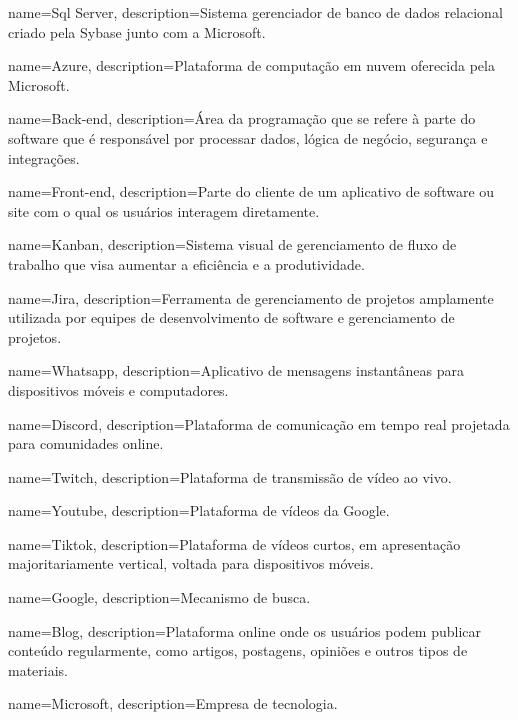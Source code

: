  {
    name=Sql Server,
    description={Sistema gerenciador de banco de dados relacional criado pela Sybase junto com a Microsoft.}
}

 {
    name=Azure,
    description={Plataforma de computação em nuvem oferecida pela Microsoft.}
}

 {
    name=Back-end,
    description={Área da programação que se refere à parte do software que é responsável por processar dados, lógica de negócio, segurança e integrações.}
}

 {
    name=Front-end,
    description={Parte do cliente de um aplicativo de software ou site com o qual os usuários interagem diretamente.}
}

 {
    name=Kanban,
    description={Sistema visual de gerenciamento de fluxo de trabalho que visa aumentar a eficiência e a produtividade.}
}

 {
    name=Jira,
    description={Ferramenta de gerenciamento de projetos amplamente utilizada por equipes de desenvolvimento de software e gerenciamento de projetos.}
}

 {
    name=Whatsapp,
    description={Aplicativo de mensagens instantâneas para dispositivos móveis e computadores.}
}

 {
    name=Discord,
    description={Plataforma de comunicação em tempo real projetada para comunidades online.}
}

 {
    name=Twitch,
    description={Plataforma de transmissão de vídeo ao vivo.}
}

 {
    name=Youtube,
    description={Plataforma de vídeos da Google.}
}

 {
    name=Tiktok,
    description={Plataforma de vídeos curtos, em apresentação majoritariamente vertical, voltada para dispositivos móveis.}
}

 {
    name=Google,
    description={Mecanismo de busca.}
}

 {
    name=Blog,
    description={Plataforma online onde os usuários podem publicar conteúdo regularmente, como artigos, postagens, opiniões e outros tipos de materiais.}
}

 {
    name=Microsoft,
    description={Empresa de tecnologia.}
}

